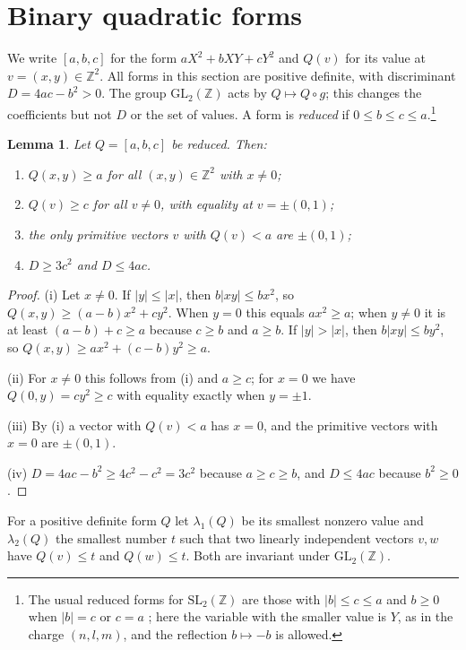 \documentclass[11pt]{amsart}
\newtheorem{lemma}[theorem]{Lemma}
\theoremstyle{definition}
\newcommand{\ZZ}{\mathbb{Z}}
\begin{document}
\section{Binary quadratic forms}\label{sec:forms}

We write $[a,b,c]$ for the form $aX^2+bXY+cY^2$ and $Q(v)$ for its value at $v=(x,y)\in\ZZ^2$. All forms in this section are positive definite, with discriminant $D=4ac-b^2>0$. The group $\mathrm{GL}_2(\ZZ)$ acts by $Q\mapsto Q\circ g$; this changes the coefficients but not $D$ or the set of values. A form is \emph{reduced} if $0\le b\le c\le a$.\footnote{The usual reduced forms for $\mathrm{SL}_2(\ZZ)$ are those with $|b|\le c\le a$ and $b\ge0$ when $|b|=c$ or $c=a$ \cite[\S2.2]{Bue89}; here the variable with the smaller value is $Y$, as in the charge $(n,l,m)$, and the reflection $b\mapsto-b$ is allowed.}

\begin{lemma}\label{lem:minima}
Let $Q=[a,b,c]$ be reduced. Then:
\begin{enumerate}
\item[(i)] $Q(x,y)\ge a$ for all $(x,y)\in\ZZ^2$ with $x\ne0$;
\item[(ii)] $Q(v)\ge c$ for all $v\ne0$, with equality at $v=\pm(0,1)$;
\item[(iii)] the only primitive vectors $v$ with $Q(v)<a$ are $\pm(0,1)$;
\item[(iv)] $D\ge3c^2$ and $D\le4ac$.
\end{enumerate}
\end{lemma}

\begin{proof}
(i) Let $x\ne0$. If $|y|\le|x|$, then $b|xy|\le bx^2$, so $Q(x,y)\ge(a-b)x^2+cy^2$. When $y=0$ this equals $ax^2\ge a$; when $y\ne0$ it is at least $(a-b)+c\ge a$ because $c\ge b$ and $a\ge b$. If $|y|>|x|$, then $b|xy|\le by^2$, so $Q(x,y)\ge ax^2+(c-b)y^2\ge a$.

(ii) For $x\ne0$ this follows from (i) and $a\ge c$; for $x=0$ we have $Q(0,y)=cy^2\ge c$ with equality exactly when $y=\pm1$.

(iii) By (i) a vector with $Q(v)<a$ has $x=0$, and the primitive vectors with $x=0$ are $\pm(0,1)$.

(iv) $D=4ac-b^2\ge4c^2-c^2=3c^2$ because $a\ge c\ge b$, and $D\le4ac$ because $b^2\ge0$.
\end{proof}

For a positive definite form $Q$ let $\lambda_1(Q)$ be its smallest nonzero value and $\lambda_2(Q)$ the smallest number $t$ such that two linearly independent vectors $v,w$ have $Q(v)\le t$ and $Q(w)\le t$. Both are invariant under $\mathrm{GL}_2(\ZZ)$.
\end{document}
